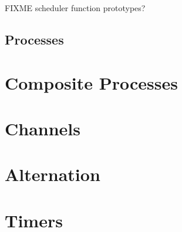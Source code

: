 FIXME scheduler function prototypes?

\subsection{Processes}



\section{Composite Processes}

\section{Channels}

\section{Alternation}

\section{Timers}






